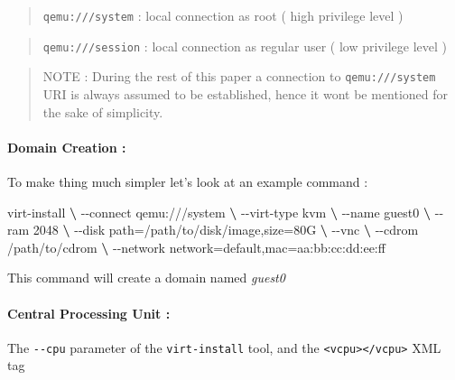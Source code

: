 \documentclass[
  14pt,
  english,
  a4paper,
]{scrreprt}
\newenvironment{Shaded}{}{}
\newcommand{\ExtensionTok}[1]{#1}
\newcommand{\KeywordTok}[1]{\textcolor[rgb]{0.00,0.44,0.13}{\textbf{#1}}}
\newcommand{\NormalTok}[1]{#1}
\begin{document}
\begin{quote}
\texttt{qemu:///system} : local connection as root ( high privilege
level )
\end{quote}

\begin{quote}
\texttt{qemu:///session} : local connection as regular user ( low
privilege level )
\end{quote}

\begin{quote}
NOTE : During the rest of this paper a connection to
\texttt{qemu:///system} URI is always assumed to be established, hence
it wont be mentioned for the sake of simplicity.
\end{quote}

\hypertarget{domain-creation}{%
\paragraph{Domain Creation :}\label{domain-creation}}

To make thing much simpler let's look at an example command :

\begin{Shaded}
\begin{Highlighting}[]
\ExtensionTok{virt{-}install} \KeywordTok{\textbackslash{}}
\ExtensionTok{{-}{-}connect}\NormalTok{ qemu:///system }\KeywordTok{\textbackslash{}}
\ExtensionTok{{-}{-}virt{-}type}\NormalTok{ kvm }\KeywordTok{\textbackslash{}}
\ExtensionTok{{-}{-}name}\NormalTok{ guest0 }\KeywordTok{\textbackslash{}}
\ExtensionTok{{-}{-}ram}\NormalTok{ 2048 }\KeywordTok{\textbackslash{}}
\ExtensionTok{{-}{-}disk}\NormalTok{ path=/path/to/disk/image,size=80G }\KeywordTok{\textbackslash{}}
\ExtensionTok{{-}{-}vnc} \KeywordTok{\textbackslash{}}
\ExtensionTok{{-}{-}cdrom}\NormalTok{ /path/to/cdrom }\KeywordTok{\textbackslash{}}
\ExtensionTok{{-}{-}network}\NormalTok{ network=default,mac=aa:bb:cc:dd:ee:ff}
\end{Highlighting}
\end{Shaded}

This command will create a domain named \emph{guest0}

\hypertarget{central-processing-unit-1}{%
\paragraph{Central Processing Unit :}\label{central-processing-unit-1}}

The \texttt{-\/-cpu} parameter of the \texttt{virt-install} tool, and
the \texttt{\textless{}vcpu\textgreater{}\textless{}/vcpu\textgreater{}}
XML tag
\end{document}
